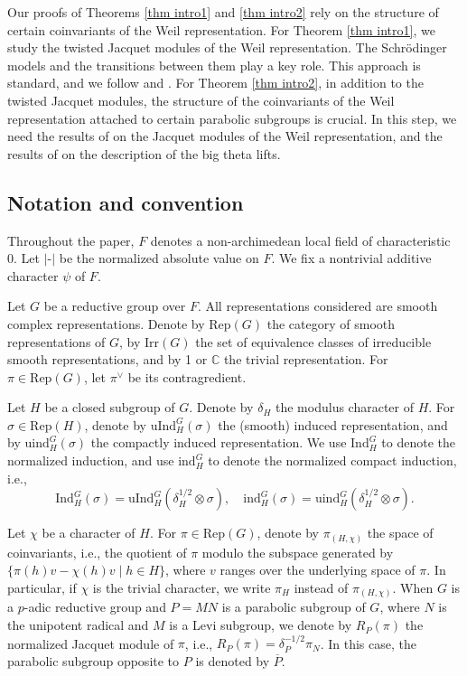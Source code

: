\documentclass[11pt,reqno]{amsart}
\renewcommand{\1}{{\mathbf{1}}} \newcommand{\sB}{{\mathscr{B}}}
\newcommand{\BC}{{\mathbb {C}}} \newcommand{\BD}{{\mathbb {D}}}
\newcommand{\Ind}{{\mathrm{Ind}}} \newcommand{\ind}{{\mathrm{ind}}}
\newcommand{\uind}{{\mathrm{uind}}} \newcommand{\uInd}{{\mathrm{uInd}}}
\newcommand{\Irr}{{\mathrm{Irr}}} \newcommand{\cInd}{{\mathrm{c-Ind}}}
\newcommand{\Rep}{{\mathrm{Rep}}}\newcommand{\rec}{{\mathrm{rec}}} \newcommand{\rat}{{\mathrm{ra}}}
\theoremstyle{plain}
\theoremstyle{definition}
\numberwithin{equation}{section}
\begin{document}
Our proofs of Theorems \ref{thm intro1} and \ref{thm intro2} rely on the structure of certain coinvariants  of the Weil representation. 
For Theorem  \ref{thm intro1}, we study the twisted Jacquet modules of the Weil representation. The Schrödinger models and the transitions between them play a key role. This approach is standard, and we follow \cite{gz} and \cite{gan19}. For Theorem  \ref{thm intro2}, in addition to  the twisted Jacquet modules, the structure of the coinvariants of the Weil representation attached to certain parabolic subgroups is crucial. In this step, we need the results of \cite{min} on the Jacquet modules of the Weil representation, and the results of \cite{chen} on the description of the big theta lifts.

\subsection{Notation and convention}
Throughout the paper, $F$ denotes a non-archimedean local field of characteristic 0. Let $|\textrm{-}|$  be the normalized absolute value on $F$.
We fix a nontrivial additive character $\psi$ of $F$. 

Let $G$ be a reductive group over $F$. All representations considered are smooth complex representations. Denote by $\Rep(G)$ the category of smooth representations of $G$, by $\Irr(G)$ the set of equivalence classes of irreducible smooth representations, and by 1 or $\BC$ the trivial representation. For $\pi\in\Rep(G)$, let $\pi^\vee$ be its contragredient. 

Let $H$ be a closed subgroup of $G$. Denote by $\delta_H$ the modulus character of $H$.  For $\sigma\in \Rep(H)$, denote by $\uInd_H^G(\sigma)$ the (smooth) induced representation, and by 
$\uind_H^G(\sigma)$ the compactly induced representation. We use $\Ind_H^G$ to denote the normalized induction, and use $\ind_H^G$ to denote the normalized compact induction, i.e.,
$$\Ind_H^G(\sigma)=\uInd_H^G(\delta_H^{1/2}\otimes\sigma),\quad\ind_H^G(\sigma)=\uind_H^G(\delta_H^{1/2}\otimes\sigma).$$ 

Let $\chi$ be a character of $H$. For $\pi\in\Rep(G)$, denote by $\pi_{(H,\chi)}$ the space of coinvariants, i.e., the quotient of $\pi$ modulo the subspace generated by $\{\pi(h)v-\chi(h)v\mid h\in H \}$, where $v$ ranges
over the underlying space of $\pi$. In particular, if $\chi$ is the trivial character, we write $\pi_H$ instead of $\pi_{(H,\chi)}$.
When $G$ is a $p$-adic reductive group and $P=MN$ is a parabolic subgroup of $G$, where $N$ is the unipotent radical and $M$ is a Levi subgroup, we denote by $R_P(\pi)$ the normalized Jacquet module of $\pi$, i.e., $R_P(\pi)=\delta_P^{-1/2}\pi_N$. In this case, the parabolic subgroup opposite to $P$ is denoted by $\overline{P}$.
\end{document}
